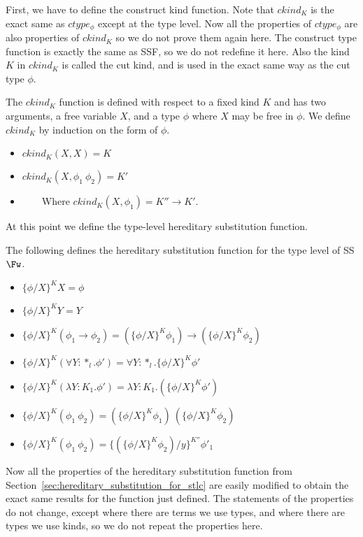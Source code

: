 First, we have to define the construct kind function.  Note that
$ckind_K$ is the exact same as $ctype_\phi$ except at the type level.
Now all the properties of $ctype_\phi$ are also properties of
$ckind_K$ so we do not prove them again here.  The construct type
function is exactly the same as SSF, so we do not redefine it here.
Also the kind $K$ in $ckind_K$ is called the cut kind, and is used in
the exact same way as the cut type $\phi$.
\begin{definition}
  \label{def:ctype_stlc}
  The $ckind_K$ function is defined with respect to a fixed kind $K$
  and has two arguments, a free variable $X$, and a type $\phi$ where $X$
  may be free in $\phi$.  We define $ckind_K$ by induction on the form of $\phi$.
\begin{itemize}
\item[] $ckind_K(X,X) = K$
  \item[] $ckind_K(X,\phi_1\ \phi_2) = K'$
  \item[] \ \ \ \ Where $ckind_K(X,\phi_1) = K'' \to K'$.
  \end{itemize}
\end{definition}
\noindent
At this point we define the type-level hereditary substitution function.
\begin{definition}
  \label{def:hereditary_substitution_function__type_level_ssfw}
  The following defines the hereditary substitution function for the
  type level of SS$\Fw$.  
  \begin{itemize}
  \item[] $\{\phi/X\}^K X = \phi$
  \item[] $\{\phi/X\}^K Y = Y$
  \item[] $\{\phi/X\}^K (\phi_1 \to \phi_2) = (\{\phi/X\}^K \phi_1) \to (\{\phi/X\}^K \phi_2)$
  \item[] $\{\phi/X\}^K (\forall Y:*_l.\phi') = \forall Y:*_l.\{\phi/X\}^K \phi'$
  \item[] $\{\phi/X\}^K (\lambda Y:K_1.\phi') = \lambda Y:K_1.(\{\phi / X\}^K \phi')$
  \item[] $\{\phi/X\}^K (\phi_1\ \phi_2) = (\{\phi/X\}^K \phi_1)\ (\{\phi/X\}^K \phi_2)$
  \item[] $\{\phi/X\}^{K} (\phi_1\ \phi_2) = \{(\{\phi/X\}^{K} \phi_2)/y\}^{K''} \phi'_1$
  \end{itemize}
\end{definition}
Now all the properties of the hereditary substitution function from
Section~\ref{sec:hereditary_substitution_for_stlc}
are easily modified to obtain the exact same results for the function
just defined.  The statements of the properties do not change, except
where there are terms we use types, and where there are types we use
kinds, so we do not repeat the properties here.  

